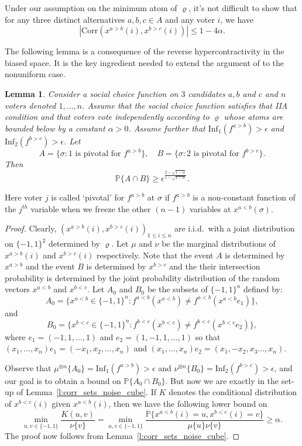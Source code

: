 \documentclass[11pt]{amsart}
\newcommand{\PP}{\mathbb{P}}
\newcommand{\eps}{\epsilon}
\newcommand{\1}{\mathbf{1}}
\newcommand{\I}{\mathrm{Inf}}
\theoremstyle{definition}
\theoremstyle{plain}
\newtheorem{lemma}[example]{Lemma}
\theoremstyle{remark}
\numberwithin{equation}{section}
\begin{document}
 Under our assumption on the minimum atom of $\varrho$, it's not difficult to show that  for any three distinct alternatives $a, b, c \in A$ and any voter $i$, we have
  \[ | \mathrm{Corr}(x^{a> b}(i), x^{b>c}(i)) | \le 1 - 4\alpha.\]

The following lemma   is a consequence of the reverse hypercontractivity in the biased space. It is the key ingredient  needed to extend the argument of \cite{Mossel11} to the nonuniform case.  
\begin{lemma} \label{lem:two_inf}
Consider a social choice function on $3$ candidates $a,b$ and $c$ and $n$ voters denoted $1,\ldots,n$. Assume that the social choice function satisfies that IIA condition and that voters vote independently according to $\varrho$ whose atoms are  bounded below by a constant $\alpha>0$. Assume further that
$\I_1(f^{a>b}) > \eps$ and $\I_2(f^{b>c}) > \eps$.
Let
\[
A = \{\sigma : 1 \mbox{ is pivotal for } f^{a>b} \}, \quad B = \{\sigma : 2 \mbox{ is pivotal for } f^{b>c} \}.
\]
Then
\[
\PP\{ A \cap B\} \geq  \eps^{\frac{2- \sqrt{1-\alpha}}{1 - \sqrt{1-\alpha}}}.
\]
\end{lemma}
Here voter $j$ is called `pivotal' for $f^{a>b}$ at  $\sigma$ if  $f^{a>b}$ is a non-constant function of the $j^{th}$ variable when we freeze the other $(n-1)$ variables at $x^{a< b}(\sigma)$.

\begin{proof}
 Clearly, $(x^{a>b}(i), x^{b>c}(i))_{ 1 \le i \le n} $ are i.i.d.\ with a joint distribution on $\{-1, 1\}^2$ determined by $\varrho$. Let $\mu$ and $\nu$ be the marginal distributions of $x^{a>b}(i)$ and  $x^{b>c}(i)$ respectively. Note that the event $A$ is determined by $x^{a>b}$ and the event $B$ is determined by $x^{b>c}$ and the their intersection probability is determined
by the joint probability distribution of the random vectors $x^{a<b}$ and $x^{b<c}$.  Let $A_0$ and $B_0$ be the subsets of $\{-1, 1\}^n$ defined by:
\[ A_0 = \{ x^{a<b} \in \{-1, 1\}^n: f^{a<b}(x^{a<b}) \ne  f^{a<b}(x^{a<b} e_1) \}, \]
and \[  B_0 = \{ x^{b<c} \in \{-1, 1\}^n: f^{b<c}(x^{b<c}) \ne  f^{b<c}(x^{b<c}  e_2) \},\]
where $e_1 = (-1,1,\ldots,1)$ and $e_2 = (1,-1,1,\ldots,1)$ so that 
$(x_1,\ldots,x_n) e_1 = (-x_1,x_2,\ldots,x_n)$ and $(x_1,\ldots,x_n) e_2 = (x_1,-x_2,x_3\ldots,x_n)$.

Observe that  $\mu^{\otimes n}\{A_0\} = \I_1(f^{a>b}) > \eps$ and $\nu^{\otimes n}\{B_0\}  = \I_2(f^{b>c}) > \eps$, and our goal is to obtain a bound on $\PP\{A_0 \cap B_0\}$. But now we are exactly in the set-up of Lemma~\ref{l:corr_sets_noise_cube}.
If $K$ denotes the conditional distribution of $x^{b<c}(i)$ given $x^{a<b}(i)$, then we have the following lower bound on
\[ \min_{u, v \in \{ -1, 1\} } \frac{K(u, v)}{\nu\{v\}} = \min_{u, v \in \{ -1, 1\} } \frac{\PP \{ x^{a<b}(i) = u, x^{b<c}(i) = v \}}{\mu\{u\}\nu\{v\}}  \ge \alpha.  \]
The proof now follows from Lemma~\ref{l:corr_sets_noise_cube}.
\end{proof}
\end{document}

